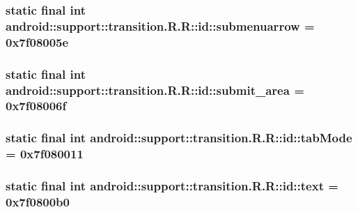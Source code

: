 \hypertarget{classandroid_1_1support_1_1transition_1_1_r_1_1id_76b59c51b9c99da5b0374c7eed75437f}{
\subsubsection[{submenuarrow}]{\setlength{\rightskip}{0pt plus 5cm}static final int android::support::transition.R.R::id::submenuarrow = 0x7f08005e}}
\label{classandroid_1_1support_1_1transition_1_1_r_1_1id_76b59c51b9c99da5b0374c7eed75437f}


\hypertarget{classandroid_1_1support_1_1transition_1_1_r_1_1id_6bb737725f4169f461410f6b71933bed}{
\subsubsection[{submit\_\-area}]{\setlength{\rightskip}{0pt plus 5cm}static final int android::support::transition.R.R::id::submit\_\-area = 0x7f08006f}}
\label{classandroid_1_1support_1_1transition_1_1_r_1_1id_6bb737725f4169f461410f6b71933bed}


\hypertarget{classandroid_1_1support_1_1transition_1_1_r_1_1id_70a43b2ad93847259d0ff439664e0b29}{
\subsubsection[{tabMode}]{\setlength{\rightskip}{0pt plus 5cm}static final int android::support::transition.R.R::id::tabMode = 0x7f080011}}
\label{classandroid_1_1support_1_1transition_1_1_r_1_1id_70a43b2ad93847259d0ff439664e0b29}


\hypertarget{classandroid_1_1support_1_1transition_1_1_r_1_1id_61829ed6bd9261ef6b4531ecf5eb8f7f}{
\subsubsection[{text}]{\setlength{\rightskip}{0pt plus 5cm}static final int android::support::transition.R.R::id::text = 0x7f0800b0}}
\label{classandroid_1_1support_1_1transition_1_1_r_1_1id_61829ed6bd9261ef6b4531ecf5eb8f7f}


